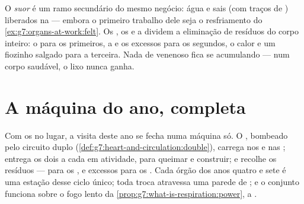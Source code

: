 \begin{remark}\label{rem:g7:removing-wastes:sweat}
O \emph{suor} é um ramo secundário do mesmo negócio: água e
sais (com traços de ) liberados na  --- embora o primeiro
trabalho dele seja o resfriamento do
\cref{ex:g7:organs-at-work:felt}. Os , os  e a 
dividem a eliminação de resíduos do corpo inteiro: o 
para os primeiros, a  e os excessos para os segundos, o calor e um
fiozinho salgado para a terceira. Nada de venenoso fica se acumulando
--- num corpo saudável, o lixo nunca ganha.
\end{remark}

\section{A máquina do ano, completa}

\begin{proposition}\label{prop:g7:removing-wastes:complete}
Com os  no lugar, a visita deste ano se fecha numa máquina só. O
, bombeado pelo circuito duplo
(\cref{def:g7:heart-and-circulation:double}), carrega  nos
 e  nas ; entrega os dois a cada 
em atividade, para queimar e construir; e recolhe os resíduos ---  para os ,  e excessos para os . Cada órgão
dos anos quatro e sete é uma estação desse ciclo único; toda troca
atravessa uma parede de ; e o conjunto funciona sobre o fogo
lento da \cref{prop:g7:what-is-respiration:power},  a .
\end{proposition}
\admitted

